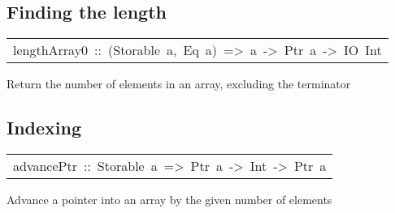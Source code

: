 \subsection{Finding the length
}
\begin{haddockdesc}
\item[\begin{tabular}{@{}l}
lengthArray0\ ::\ (Storable\ a,\ Eq\ a)\ =>\ a\ ->\ Ptr\ a\ ->\ IO\ Int
\end{tabular}]\haddockbegindoc
Return the number of elements in an array, excluding the terminator
\par

\end{haddockdesc}
\subsection{Indexing
}
\begin{haddockdesc}
\item[\begin{tabular}{@{}l}
advancePtr\ ::\ Storable\ a\ =>\ Ptr\ a\ ->\ Int\ ->\ Ptr\ a
\end{tabular}]\haddockbegindoc
Advance a pointer into an array by the given number of elements
\par

\end{haddockdesc}